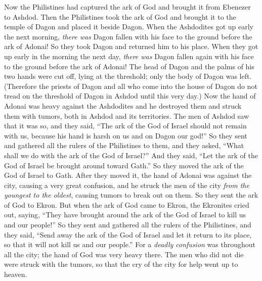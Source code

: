 \begin{biblechapter} %
 Now the Philistines had captured the ark of God and brought it from Ebenezer to Ashdod.
\verse Then the Philistines took the ark of God and brought it to the temple of Dagon and placed it beside Dagon.
\verse When the Ashdodites got up early the next morning, \textit{there was} Dagon fallen with his face to the ground before the ark of Adonai! So they took Dagon and returned him to his place.
\verse When they got up early in the morning the next day, \textit{there was} Dagon fallen again with his face to the ground before the ark of Adonai! The head of Dagon and the palms of his two hands were cut off, lying at the threshold; only the body of Dagon was left.
\verse (Therefore the priests of Dagon and all who come into the house of Dagon do not tread on the threshold of Dagon in Ashdod until this very day.)
\verse Now the hand of Adonai was heavy against the Ashdodites and he destroyed them and struck them with tumors, both in Ashdod and its territories.
\verse The men of Ashdod saw that it was so, and they said, “The ark of the God of Israel should not remain with us, because his hand is harsh on us and on Dagon our god!”
\verse So they sent and gathered all the rulers of the Philistines to them, and they asked, “What shall we do with the ark of the God of Israel?” And they said, “Let the ark of the God of Israel be brought around toward Gath.” So they moved the ark of the God of Israel to Gath.
\verse After they moved it, the hand of Adonai was against the city, causing a very great confusion, and he struck the men of the city \textit{from the youngest to the oldest}, causing tumors to break out on them.
\verse So they sent the ark of God to Ekron. But when the ark of God came to Ekron, the Ekronites cried out, saying, “They have brought around the ark of the God of Israel to kill us and our people!”
\verse So they sent and gathered all the rulers of the Philistines, and they said, “Send away the ark of the God of Israel and let it return to its place, so that it will not kill us and our people.” For a \textit{deadly confusion} was throughout all the city; the hand of God was very heavy there.
\verse The men who did not die were struck with the tumors, so that the cry of the city for help went up to heaven.
\end{biblechapter}

